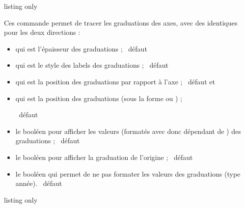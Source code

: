 
\begin{PresCodeTexPL}{listing only}
\end{PresCodeTexPL}

\begin{cautionblock}
Ces commande permet de tracer les graduations des axes, avec des  identiques pour les deux directions :

\begin{itemize}
\item {} qui est l'épaisseur des graduations ; \hfill~défaut \Cle{1pt}
\item {} qui est le style des labels des graduations ; \hfill~défaut 
\item {} qui est la position des graduations par rapport à l'axe ; \hfill~défaut  et 
\item {} qui est la position des graduations (sous la forme  ou ) ;

\hfill~défaut \Cle{4pt}
\item le booléen  pour afficher les valeurs (formatés avec  donc dépendant de ) des graduations  ; \hfill~défaut 
\item le booléen  pour afficher la graduation de l'origine ; \hfill~défaut 
\item le booléen  qui permet de ne pas formater les valeurs des graduations (type \textsf{année}). \hfill~défaut 
\end{itemize}
\vspace*{-\baselineskip}\leavevmode
\end{cautionblock}

\begin{PresCodeTexPL}{listing only}


\end{PresCodeTexPL}

